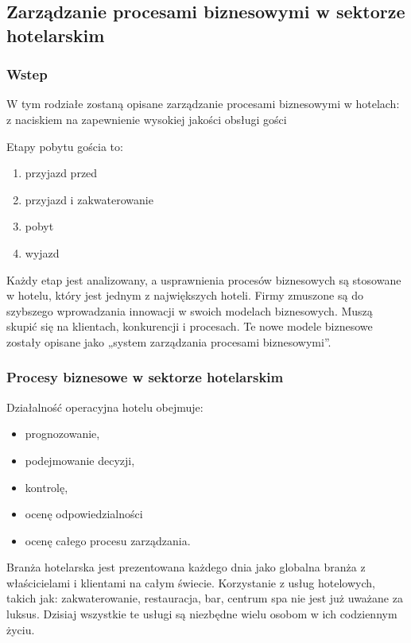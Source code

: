 \documentclass[a4paper, 12pt]{article}
\begin{document}
\subsection{Zarządzanie procesami biznesowymi w sektorze hotelarskim}
\subsubsection{Wstep}
\hspace*{1 cm} W tym rodziałe zostaną opisane zarządzanie procesami biznesowymi w hotelach: z naciskiem na zapewnienie wysokiej jakości obsługi gości

Etapy pobytu gościa to: 
\begin{enumerate}
	\item przyjazd przed
	\item przyjazd i zakwaterowanie
	\item pobyt
	\item wyjazd
\end{enumerate} 
Każdy etap jest analizowany, a usprawnienia procesów biznesowych są stosowane w hotelu, który jest jednym z największych hoteli.\newline
\hspace*{1cm}Firmy zmuszone są do szybszego wprowadzania innowacji w swoich modelach biznesowych. Muszą skupić się na klientach, konkurencji i procesach. Te nowe modele biznesowe zostały opisane jako „system zarządzania procesami biznesowymi”.
\subsubsection{Procesy biznesowe w sektorze hotelarskim}
\hspace*{1cm}Działalność operacyjna hotelu obejmuje:
\begin{itemize}
	\item prognozowanie,
	\item podejmowanie decyzji, 
	\item kontrolę, 
	\item ocenę odpowiedzialności 
	\item ocenę całego procesu zarządzania. 
\end{itemize} 
Branża hotelarska jest prezentowana każdego dnia jako globalna branża z właścicielami i klientami na całym świecie. Korzystanie z usług hotelowych, takich jak: zakwaterowanie, restauracja, bar, centrum spa nie jest już uważane za luksus. Dzisiaj wszystkie te usługi są niezbędne wielu osobom w ich codziennym życiu.\newline
\end{document}
